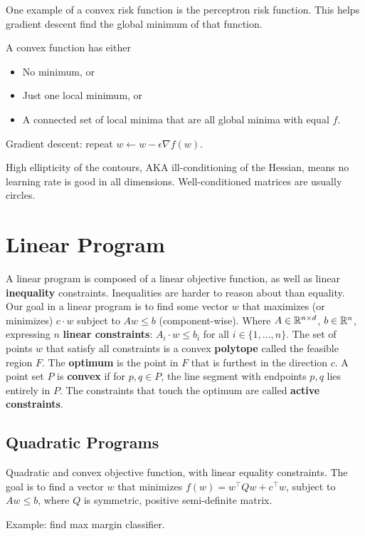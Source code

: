One example of a convex risk function is the perceptron risk function.
This helps gradient descent find the global minimum of that function.


A convex function has either
\begin{itemize}
    \item No minimum, or
    \item Just one local minimum, or
    \item A connected set of local minima that are all global minima with equal $f$.
\end{itemize}

Gradient descent:
repeat $w \gets w - \epsilon \nabla f(w)$.

High ellipticity of the contours, AKA ill-conditioning of the Hessian, means no learning rate is good in all dimensions.
Well-conditioned matrices are usually circles.

\section{Linear Program}
A linear program is composed of a linear objective function, as well as linear \textbf{inequality} constraints.
Inequalities are harder to reason about than equality.
Our goal in a linear program is to find some vector $w$ that maximizes (or minimizes) $c \cdot w$ subject to $Aw \leq b$ (component-wise).
Where $A \in \mathbb R^{n \times d}$, $b \in \mathbb R^n$, expressing $n$ \textbf{linear constraints}:
$A_i \cdot w \leq b_i$ for all $i \in \{1, ..., n\}$.
The set of points $w$ that satisfy all constraints is a convex \textbf{polytope} called the feasible region $F$.
The \textbf{optimum} is the point in $F$ that is furthest in the direction $c$.
A point set $P$ is \textbf{convex} if for $p, q \in P$, the line segment with endpoints $p, q$ lies entirely in $P$.
The constraints that touch the optimum are called \textbf{active constraints}.

\subsection{Quadratic Programs}
Quadratic and convex objective function, with linear equality constraints.
The goal is to find a vector $w$ that minimizes $f(w) = w^\top Q w  + c^\top w$, subject to $Aw \leq b$, where $Q$ is symmetric, positive semi-definite matrix.

Example: find max margin classifier.